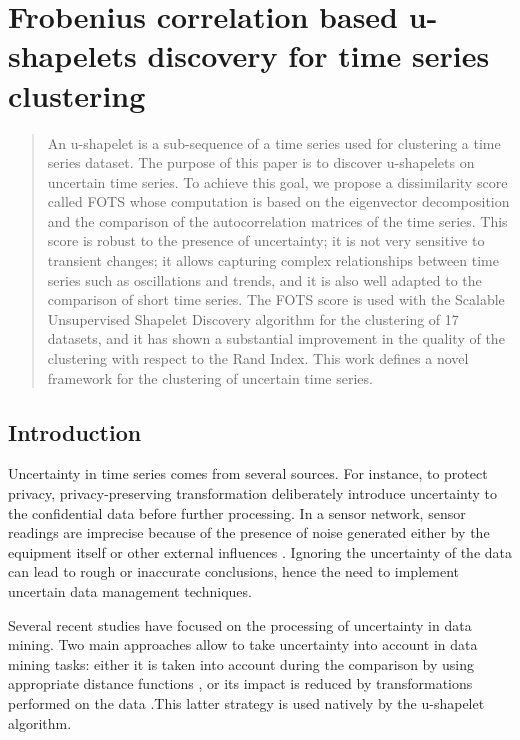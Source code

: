 \chapter[Uncertain time series u-shapelet discovery]{Frobenius correlation based u-shapelets discovery for time series clustering}

\begin{abstract}
An u-shapelet is a sub-sequence of a time series used for clustering a time series dataset. The purpose of this paper is to discover u-shapelets on uncertain time series. To achieve this goal, we propose a dissimilarity score called FOTS whose computation is based on the eigenvector decomposition and the comparison of the autocorrelation matrices of the time series. This score is robust to the presence of uncertainty; it is not very sensitive to transient changes; it allows capturing complex relationships between time series such as oscillations and trends, and it is also well adapted to the comparison of short time series. The FOTS score is  used with the Scalable Unsupervised Shapelet Discovery algorithm for the clustering of 17 datasets, and it has shown a substantial improvement in the quality of the clustering with respect to the Rand Index. This work defines a novel framework for the clustering of uncertain time series.
\end{abstract}

\section{Introduction}
Uncertainty in time series comes from several sources.  For instance, to protect privacy, privacy-preserving transformation \cite{papadimitriou2007time, aggarwal2008unifying} deliberately introduce uncertainty to the confidential data before further processing. In a sensor
network, sensor readings are imprecise because of the presence of noise generated either by the equipment
itself or other external influences \cite{cheng2003evaluating}. Ignoring the uncertainty of the data
can lead to rough or inaccurate conclusions, hence the need to implement uncertain data management techniques. 


Several recent studies have focused on the processing of uncertainty in data mining. Two main approaches allow to take uncertainty into account in data mining tasks: either it is taken into account during the comparison by using appropriate distance functions \cite{Rizvandi2013, Hwang2014, Rehfeld2014, Orang2014, Wang2015, Orang2017}, or its impact is reduced by transformations performed on the data
\cite{Orang2015}.This latter strategy is used natively by the u-shapelet algorithm.

